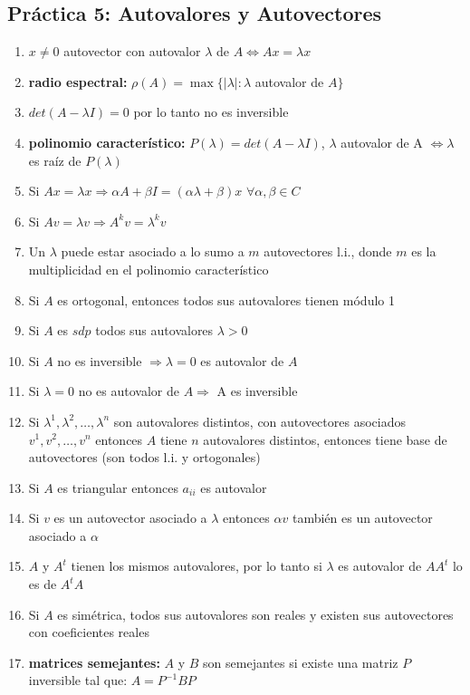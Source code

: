 \subsection*{Práctica 5: Autovalores y Autovectores}
\begin{enumerate}
    \item $x \neq 0$ autovector con autovalor $\lambda$ de $A \iff Ax = \lambda x$ 
    \item \textbf{radio espectral:} $\rho(A) = \max \{|\lambda| : \lambda$ autovalor de $A\}$
    \item $det(A-\lambda I) = 0$ por lo tanto no es inversible
    \item \textbf{polinomio característico:} $P(\lambda) = det(A-\lambda I)$, $\lambda$ autovalor de A $\iff \lambda$ es raíz de $P(\lambda)$
    \item Si $Ax = \lambda x \Rightarrow \alpha A + \beta I = (\alpha \lambda + \beta) x$ $\forall \alpha,\beta \in C$ 
    \item Si $Av = \lambda v \Rightarrow A^kv = \lambda^k v$
    \item Un $\lambda$ puede estar asociado a lo sumo a $m$ autovectores l.i., donde $m$ es la multiplicidad en el polinomio característico
    \item Si $A$ es ortogonal, entonces todos sus autovalores tienen módulo 1
    \item Si $A$ es $sdp$ todos sus autovalores $\lambda > 0$ 
    \item Si $A$ no es inversible $\Rightarrow \lambda = 0$ es autovalor de $A$
    \item Si $\lambda = 0$ no es autovalor de $A \Rightarrow$ A es inversible
    \item Si $\lambda^1, \lambda^2, \dots, \lambda^n$ son autovalores distintos, con autovectores asociados $v^1, v^2, \dots, v^n$ entonces $A$ tiene $n$ autovalores distintos, entonces tiene base de autovectores (son todos l.i. y ortogonales)
    \item Si $A$ es triangular entonces $a_{ii}$ es autovalor
    \item Si $v$ es un autovector asociado a $\lambda$ entonces $\alpha v$ también es un autovector asociado a $\alpha$
    \item $A$ y $A^t$ tienen los mismos autovalores, por lo tanto si $\lambda$ es autovalor de $AA^t$ lo es de $A^tA$ 
    \item Si $A$ es simétrica, todos sus autovalores son reales y existen sus autovectores con coeficientes reales
    \item \textbf{matrices semejantes:} $A$ y $B$ son semejantes si existe una matriz $P$ inversible tal que: $A = P^{-1}BP$

\end{enumerate}
